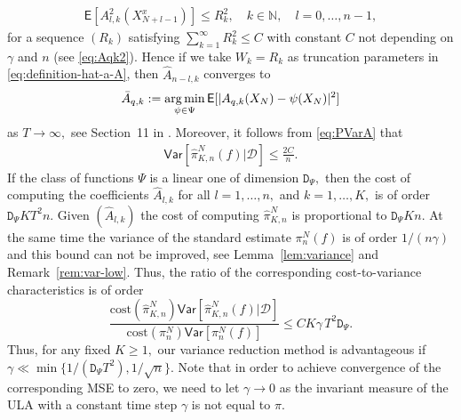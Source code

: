 \documentclass[bj]{imsart}
\def\PE{\mathsf{E}}
\def\PVar{\mathsf{Var}}
\def\nset{\mathbb{N}}
\def\TrainSet{\mathcal{D}}
\newcommand*{\argmin}{\operatornamewithlimits{arg\,min}}
\begin{document}
\begin{eqnarray*}
\PE[A^2_{l,k}(X^x_{N+l-1})]\leq R^2_k ,\quad k \in \nset, \quad l=0,\ldots,n-1,
\end{eqnarray*}
for a sequence  $(R_k)$ satisfying $\sum_{k=1}^\infty R^2_k\leq C$ with constant $C$  not depending  on $\gamma$ and $n$ (see \eqref{eq:Aqk2}).  Hence if we take $W_k=R_k$ as truncation parameters in \eqref{eq:definition-hat-a-A}, then $\widehat A_{n-l,k}$ converges to
\[
\bar A_{q,k}:=\argmin_{\psi\in\Psi}\mathsf{E}[|A_{q,k}(X_{N})-\psi(X_{N})|^2]
\]
 as $T\to \infty,$ see Section~11 in \cite{gyorfi2006distribution}.  Moreover, it follows from \eqref{eq:PVarA} that
\begin{eqnarray*}
\PVar[\widehat \pi_{K,n}^N(f)|\TrainSet]\leq \frac{2C}{n}.
\end{eqnarray*}
If the class of functions $\Psi$ is a linear one of dimension $\mathtt{D}_\Psi,$ then the cost of computing the coefficients $\widehat A_{l,k}$ for all $l=1,\ldots,n,$ and $k=1,\ldots,K,$ is of order  $ \mathtt{D}_\Psi K T^2 n$. Given $(\widehat A_{l,k})$ the cost of computing  $\widehat \pi_{K,n}^N$ is proportional to $\mathtt{D}_\Psi K n.$ At the same time the variance of the standard estimate $ \pi_{n}^N(f)$ is of order $1/(n\gamma)$ and this bound can not be improved, see Lemma~\ref{lem:variance} and Remark~\ref{rem:var-low}. Thus, the ratio of the corresponding cost-to-variance characteristics  is of order
\begin{equation}
\label{eq:cost_theoretical}
\frac{\mathrm{cost}(\widehat \pi_{K,n}^N) \PVar[\widehat \pi_{K,n}^N(f)|\TrainSet]}{\mathrm{cost}(\pi_{n}^N)\PVar[\pi_{n}^N(f)]}\leq C  K \gamma \, T^2 \mathtt{D}_\Psi.
\end{equation}
Thus, for any fixed $K\geq 1,$  our variance reduction method is advantageous if $\gamma\ll\min\{1/(\mathtt{D}_\Psi T^2),1/\sqrt{n}\}.$  Note that in order to achieve convergence of the corresponding MSE to zero, we need to let $\gamma\to 0$ as the invariant measure of the ULA with a constant time step $\gamma$ is not equal to $\pi.$
\end{document}
